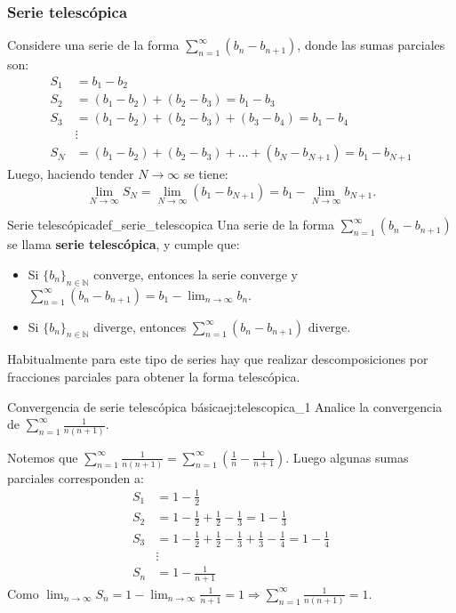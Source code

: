 \subsubsection*{Serie telescópica}
Considere una serie de la forma $\displaystyle\sum_{n=1}^{\infty}(b_n - b_{n+1})$, donde las sumas parciales son:
\begin{align*}
    S_1 &= b_1 - b_2 \\
    S_2 &= (b_1 - b_2) + (b_2 - b_3) = b_1 - b_3 \\
    S_3 &= (b_1 - b_2) + (b_2 - b_3) + (b_3 - b_4) = b_1 - b_4 \\
    &\vdots \\
    S_N &= (b_1 - b_2) + (b_2 - b_3) + \dots + (b_N - b_{N+1}) = b_1 - b_{N+1}
\end{align*}
Luego, haciendo tender $N\to \infty$ se tiene:
\[ \displaystyle\lim_{N\to\infty}S_N = \lim_{N\to\infty}(b_1 - b_{N+1}) = b_1 - \lim_{N\to\infty}b_{N+1}. \]

\begin{definition}{Serie telescópica}{def_serie_telescopica}
    Una serie de la forma $\displaystyle\sum_{n=1}^{\infty}(b_n - b_{n+1})$ se llama \textbf{serie telescópica}, y cumple que:
    \begin{itemize}
        \item Si $\{b_n\}_{n \in \mathbb{N}}$ converge, entonces la serie converge y $\displaystyle\sum_{n=1}^{\infty}(b_n - b_{n+1}) = b_1 - \lim_{n\to\infty}b_n$.
        \item Si $\{b_n\}_{n \in \mathbb{N}}$ diverge, entonces $\displaystyle\sum_{n=1}^{\infty}(b_n - b_{n+1})$ diverge.
    \end{itemize}
\end{definition}

Habitualmente para este tipo de series hay que realizar descomposiciones por fracciones parciales para obtener la forma telescópica.

\begin{example}{Convergencia de serie telescópica básica}{ej:telescopica_1}
    Analice la convergencia de $\displaystyle\sum_{n=1}^{\infty}\frac{1}{n(n+1)}$.
\end{example}

\begin{soln}
    Notemos que $\displaystyle\sum_{n=1}^{\infty}\frac{1}{n(n+1)} = \sum_{n=1}^{\infty}\left(\frac{1}{n} - \frac{1}{n+1}\right)$. Luego algunas sumas parciales corresponden a:
    \begin{align*}
        S_1 &= 1 - \frac{1}{2} \\
        S_2 &= 1 - \frac{1}{2} + \frac{1}{2} - \frac{1}{3} = 1 - \frac{1}{3} \\
        S_3 &= 1 - \frac{1}{2} + \frac{1}{2} - \frac{1}{3} + \frac{1}{3} - \frac{1}{4} = 1 - \frac{1}{4} \\
        &\vdots \\
        S_n &= 1 - \frac{1}{n+1}
    \end{align*}
    Como $\displaystyle\lim_{n\to\infty}S_n = 1 - \lim_{n\to\infty}\frac{1}{n+1} = 1 \Longrightarrow \sum_{n=1}^{\infty}\frac{1}{n(n+1)} = 1$.
\end{soln}

